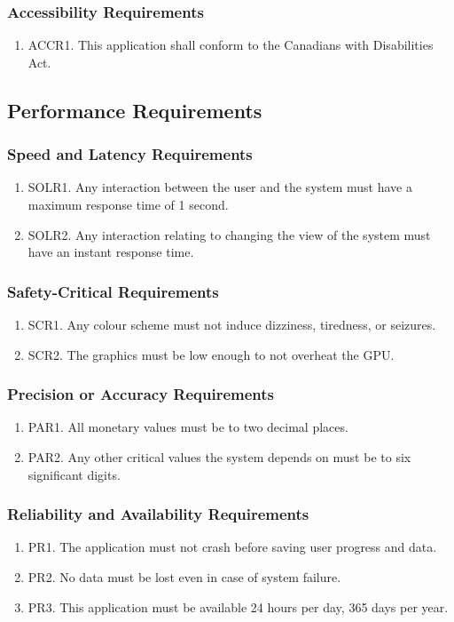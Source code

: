 \documentclass[]{article}
\begin{document}
\subsubsection{Accessibility Requirements}
\begin{enumerate}
	\item ACCR1. This application shall conform to the Canadians with Disabilities Act.
\end{enumerate}

\subsection{Performance Requirements}
\subsubsection{Speed and Latency Requirements}
\begin{enumerate}
	\item SOLR1. Any interaction between the user and the system must have a maximum response time of 1 second.
	\item SOLR2. Any interaction relating to changing the view of the system must have an instant response time.
\end{enumerate}

\subsubsection{Safety-Critical Requirements}
\begin{enumerate}
	\item SCR1. Any colour scheme must not induce dizziness, tiredness, or seizures.
	\item SCR2. The graphics must be low enough to not overheat the GPU.
\end{enumerate}

\subsubsection{Precision or Accuracy Requirements}
\begin{enumerate}
	\item PAR1. All monetary values must be to two decimal places.
	\item PAR2. Any other critical values the system depends on must be to six significant digits.
\end{enumerate}

\subsubsection{Reliability and Availability Requirements}
\begin{enumerate}
	\item PR1. The application must not crash before saving user progress and data.
	\item PR2. No data must be lost even in case of system failure.
	\item PR3. This application must be available 24 hours per day, 365 days per year. 
\end{enumerate}
\end{document}
